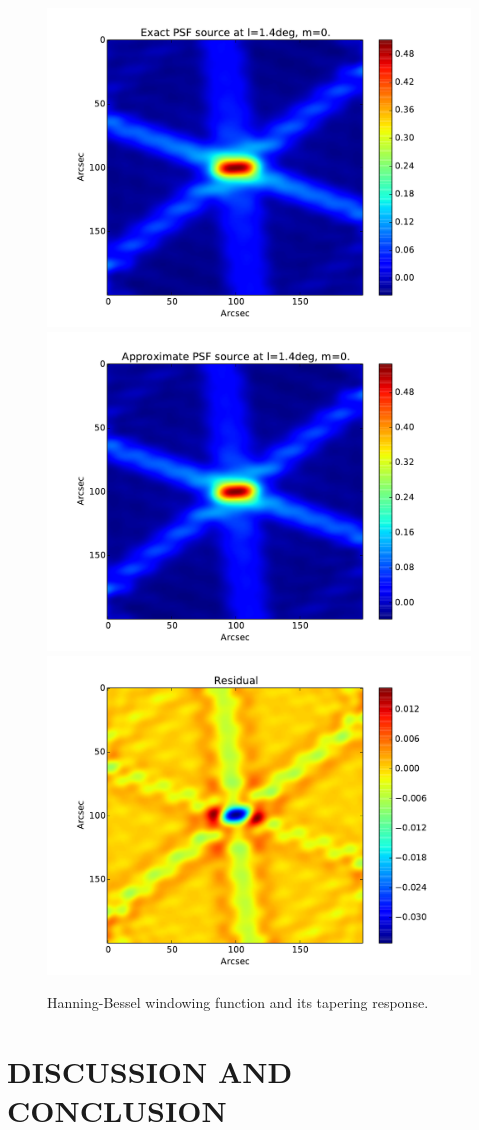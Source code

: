 \begin{figure}
\includegraphics[width=.5\textwidth]{./Figures/exact_14deg.pdf}%
\includegraphics[width=.5\textwidth]{./Figures/approximate.pdf}
\includegraphics[width=.5\textwidth]{./Figures/residual_14deg.pdf}%
\caption{Hanning-Bessel windowing function and its tapering response.}\label{fig:wf:bessel-han}
\end{figure}

 \section{DISCUSSION AND CONCLUSION}
 

